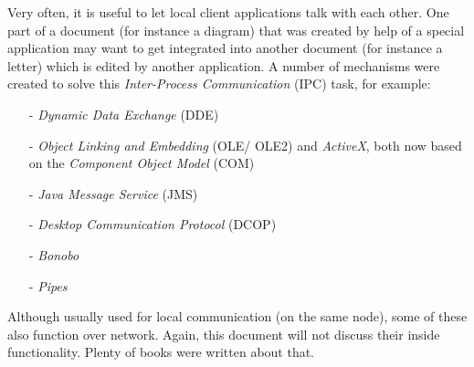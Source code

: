 Very often, it is useful to let local client applications talk with each other.
One part of a document (for instance a diagram) that was created by help of a
special application may want to get integrated into another document (for instance
a letter) which is edited by another application. A number of mechanisms were
created to solve this \emph{Inter-Process Communication} (IPC) task, for example:

\begin{itemize}
    \item[-] \emph{Dynamic Data Exchange} (DDE) \cite{ddefaq}
    \item[-] \emph{Object Linking and Embedding} (OLE/ OLE2) and \emph{ActiveX},
        both now based on the \emph{Component Object Model} (COM)
        \cite{zimmermann, gruhn}
    \item[-] \emph{Java Message Service} (JMS) \cite{java}
    \item[-] \emph{Desktop Communication Protocol} (DCOP) \cite{kde}
    \item[-] \emph{Bonobo} \cite{gnome}
    \item[-] \emph{Pipes} \cite{johnson, tanenbaum2001}
\end{itemize}

Although usually used for local communication (on the same node), some of these
also function over network. Again, this document will not discuss their inside
functionality. Plenty of books were written about that.
